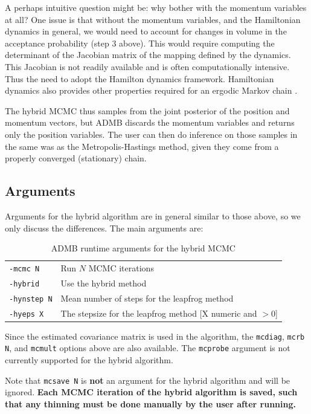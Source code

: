 \documentclass{article}\usepackage[]{graphicx}\usepackage[]{color}
\begin{document}
A perhaps intuitive question might be: why bother with the
momentum variables at all? One issue is that without the
momentum variables, and the Hamiltonian dynamics in general,
we would need to account for changes in volume in the
acceptance probability (step 3 above)\cite{brooks2011}. This
would require computing the determinant of the Jacobian
matrix of the mapping defined by the dynamics. This Jacobian
is not readily available and is often computationally
intensive. Thus the need to adopt the Hamilton dynamics
framework.  Hamiltonian dynamics also provides other
properties required for an ergodic Markov chain
\cite{brooks2011}.

The hybrid MCMC thus samples from the joint posterior of the
position and momentum vectors, but ADMB discards the
momentum variables and returns only the position
variables. The user can then do inference on those samples
in the same was as the Metropolis-Hastings method, given
they come from a properly converged (stationary) chain.

\subsection{Arguments}
Arguments for the hybrid algorithm are in general similar to
those above, so we only discuss the differences. The main
arguments are:
\begin{table}[H]
  \centering
  \begin{tabular}[h]{|ll|}
    \hline
    \texttt{-mcmc N} & Run $N$ MCMC iterations\\
    \texttt{-hybrid} & Use the hybrid method\\
    \texttt{-hynstep N} & Mean number of steps for the leapfrog method\\
    \texttt{-hyeps X} & The stepsize for the leapfrog method [X numeric and $>0$]\\
    \hline
  \end{tabular}
  \caption{ADMB runtime arguments for the hybrid MCMC}
  \label{tab:hy_args}
\end{table}
Since the estimated covariance matrix is used in the
algorithm, the \texttt{mcdiag}, \texttt{mcrb N}, and
\texttt{mcmult} options above are also available. The
\texttt{mcprobe} argument is not currently supported for the
hybrid algorithm.

Note that \texttt{mcsave N} is \textbf{not} an argument for
the hybrid algorithm and will be ignored. \textbf{Each MCMC
iteration of the hybrid algorithm is saved, such that any
thinning must be done manually by the user after running.}
\end{document}
